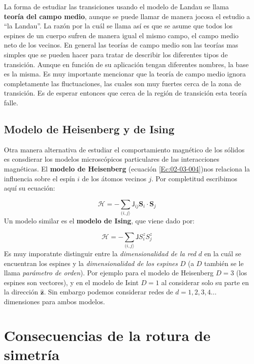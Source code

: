 \documentclass[12pt,a4paper]{book}
\numberwithin{equation}{section}
\numberwithin{figure}{section}
\newcommand{\Hcal}{\mathcal{H}}
\newcommand{\Jsf}{\mathsf{J}}
\newcommand{\zn}{\mathbf{z}}
\newcommand{\Sn}{\mathbf{S}}
\newcommand{\hnz}{\hat{\zn}}
\begin{document}
La forma de estudiar las transiciones usando el modelo de Landau se llama \textbf{teoría del campo medio}, aunque se puede llamar de manera jocosa el estudio a ``la Landau''. La razón por la cuál se llama así es que se asume que todos los espines de un cuerpo sufren de manera igual el mismo campo, el campo medio neto de los vecinos. En general las teorías de campo medio son las teorías mas simples que se pueden hacer para tratar de describir los diferentes tipos de transición. Aunque en función de su aplicación tengan diferentes nombres, la base es la misma. Es muy importante mencionar que la teoría de campo medio ignora completamente las fluctuaciones, las cuales son muy fuertes cerca de la zona de transición. Es de esperar entonces que cerca de la región de transición esta teoría falle. 

\subsection{Modelo de Heisenberg y de Ising}

Otra manera alternativa de estudiar el comportamiento magnético de los sólidos es consdierar los modelos microscópicos particulares de las interacciones magnéticas. El \textbf{modelo de Heisenberg} (ecuación \ref{Ec:02-03-004})nos relaciona la influencia sobre el espín $i$ de los átomos vecinos $j$. Por completitud escribimos aquí su ecuación:


\begin{equation}
    \Hcal = - \sum_{(i,j\rangle} \Jsf_{ij} \Sn_i \cdot \Sn_j 
\end{equation}
Un modelo similar es el \textbf{modelo de Ising}, que viene dado por:

\begin{equation}
    \Hcal = - \sum_{(i,j\rangle} \Jsf S_i^z S_j^z 
\end{equation}
Es muy imporatnte distinguir entre la \textit{dimensionalidad de la red}  $d$ en la cuál se encuentran los espines y la \textit{dimensionalidad de los espines} $D$ (a $D$ también se le llama \textit{parámetro de orden}). Por ejemplo para el modelo de Heisenberg $D=3$ (los espines son vectores), y en el modelo de Isint $D=1$ al considerar solo su parte en la dirección $\hnz$. Sin embargo podemos considerar redes de $d=1,2,3,4...$ dimensiones para ambos modelos.

\section{Consecuencias de la rotura de simetría}
\end{document}
